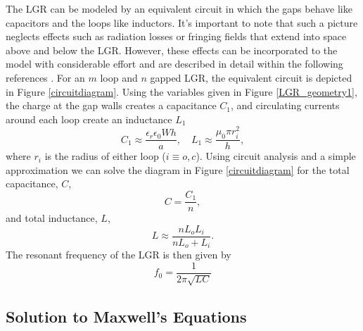 The LGR can be modeled by an equivalent circuit in which the gaps behave like capacitors and the loops like inductors. It's important to note that such a picture neglects effects such as radiation losses or fringing fields that extend into space above and below the LGR. However, these effects can be incorporated to the model with considerable effort and are described in detail within the following references \cite{mehdizadeh1983Loop, rinard2005loopgap, wood1984loop}. For an $m$ loop and $n$ gapped LGR, the equivalent circuit is depicted in Figure \ref{circuitdiagram}. Using the variables given in Figure \ref{LGR_geometry1}, the charge at the gap walls creates a capacitance $C_1$, and circulating currents around each loop create an inductance $L_1$
\begin{equation} \label{indcap}
C_1 \approx \frac{\epsilon_r \epsilon_0 W h}{a}, \quad L_1 \approx \frac{\mu_0 \pi r_i^2}{h}, 
\end{equation}
where $r_i$ is the radius of either loop ($i \equiv o,c$). Using circuit analysis and a simple approximation we can solve the diagram in Figure \ref{circuitdiagram} for the total capacitance, $C$,
\begin{equation}\label{capacitance}
C = \frac{C_1}{n},
\end{equation} 
and total inductance, $L$,
\begin{equation}\label{inductance}
L \approx \frac{n L_o L_i}{n L_o + L_i}.
\end{equation}
The resonant frequency of the LGR is then given by 
\begin{equation}
f_0 = \frac{1}{2 \pi \sqrt{LC}}
\end{equation}


\subsection{Solution to Maxwell's Equations} \label{fields}

